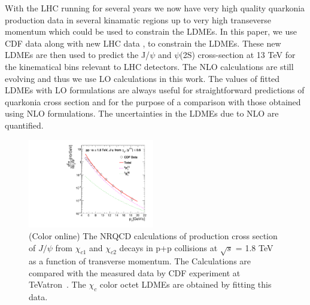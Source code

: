 \documentclass[aps,prc,preprint,superscriptaddress,showpacs,showkeys,amsmath]{revtex4-1}
\begin{document}
  With the LHC running for several years we now have very high quality quarkonia 
production data in several kinamatic regions up to very high transeverse momentum 
which could be used to constrain the LDMEs. In this paper, we use CDF data
\cite{Abe:1997yz,Abe:1997jz,Acosta:2004yw} along with new LHC data 
\cite{Chatrchyan:2011kc,Khachatryan:2015rra,Aad:2015duc},
\cite{Aaij:2012ag,Aaij:2011jh,Aaij:2015rla} to constrain 
the LDMEs. These new LDMEs are then used to predict the J/$\psi$ and $\psi$(2S)
cross-section at 13 TeV for the kinematical bins relevant to LHC detectors.
 The NLO calculations are still evolving and thus we use LO calculations in 
this work. The values of fitted LDMEs with LO formulations are always useful 
for straightforward predictions of quarkonia cross section and for the 
purpose of a comparison with those obtained using NLO formulations.
 The uncertainties in the LDMEs due to NLO are quantified. 


\begin{figure}
\includegraphics[width=0.49\textwidth]{Figures/Chic/Chic1_CDF_Fit.pdf}
\caption{(Color online) The NRQCD calculations of production cross section 
of  $J/\psi$ from $\chi_{c1}$ and $\chi_{c2}$ decays in p+p collisions at
$\sqrt{s}$ = 1.8 TeV as a function of transverse momentum. 
The Calculations are compared with the measured data by
CDF experiment at TeVatron~\cite{Abe:1997yz}. The $\chi_{c}$
color octet LDMEs are obtained by fitting this data. 
}
\label{Fig:LDMEChicCDF}
\end{figure}
\end{document}
